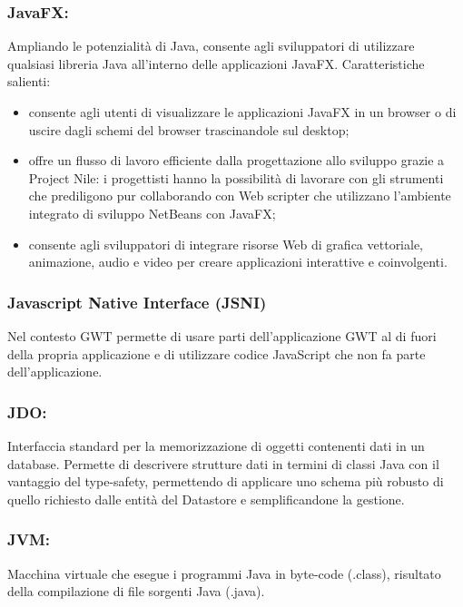 \subsubsection*{JavaFX:} Ampliando le potenzialit\`a di Java, consente agli
sviluppatori di utilizzare qualsiasi libreria Java all'interno delle applicazioni JavaFX.
Caratteristiche salienti:
\begin{itemize}
\item consente agli utenti di visualizzare le applicazioni JavaFX in un browser
o di uscire dagli schemi del browser trascinandole sul desktop; 
\item offre un flusso di lavoro efficiente dalla progettazione allo sviluppo
grazie a Project Nile: i progettisti hanno la possibilit\`a di lavorare con gli strumenti
che prediligono pur collaborando con Web scripter che utilizzano l'ambiente
integrato di sviluppo NetBeans con JavaFX;
\item consente agli sviluppatori di integrare risorse Web di grafica vettoriale,
animazione, audio e video per creare applicazioni interattive e coinvolgenti.
\end{itemize}

\subsubsection*{Javascript Native Interface (JSNI)}
Nel contesto GWT permette di usare parti dell'applicazione GWT al di fuori della
propria applicazione e di utilizzare codice JavaScript che non fa parte
dell'applicazione.

\subsubsection*{JDO:}
Interfaccia standard per la memorizzazione di oggetti contenenti dati in un
database. Permette di descrivere strutture dati in termini di classi Java con il
vantaggio del type-safety, permettendo di applicare uno schema pi\`u
robusto di quello richiesto dalle entit\`a del Datastore e semplificandone la
gestione.

\subsubsection*{JVM:} Macchina virtuale che esegue i programmi Java in byte-code
(.class), risultato della compilazione di file sorgenti Java (.java).


